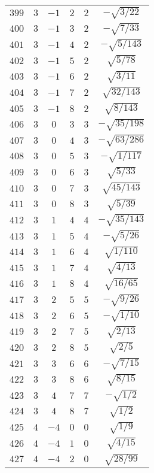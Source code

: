 \begin{table}
\begin{center}
\begin{tabular}{|c|c|c|c|c|c|}
$399$ & $3$ & $-1$ & $2$ & $2$ & $-\sqrt{3/22}$ \\ 
$400$ & $3$ & $-1$ & $3$ & $2$ & $-\sqrt{7/33}$ \\ 
$401$ & $3$ & $-1$ & $4$ & $2$ & $-\sqrt{5/143}$ \\ 
$402$ & $3$ & $-1$ & $5$ & $2$ & $\sqrt{5/78}$ \\ 
$403$ & $3$ & $-1$ & $6$ & $2$ & $\sqrt{3/11}$ \\ 
$404$ & $3$ & $-1$ & $7$ & $2$ & $\sqrt{32/143}$ \\ 
$405$ & $3$ & $-1$ & $8$ & $2$ & $\sqrt{8/143}$ \\ 
$406$ & $3$ & $0$ & $3$ & $3$ & $-\sqrt{35/198}$ \\ 
$407$ & $3$ & $0$ & $4$ & $3$ & $-\sqrt{63/286}$ \\ 
$408$ & $3$ & $0$ & $5$ & $3$ & $-\sqrt{1/117}$ \\ 
$409$ & $3$ & $0$ & $6$ & $3$ & $\sqrt{5/33}$ \\ 
$410$ & $3$ & $0$ & $7$ & $3$ & $\sqrt{45/143}$ \\ 
$411$ & $3$ & $0$ & $8$ & $3$ & $\sqrt{5/39}$ \\ 
$412$ & $3$ & $1$ & $4$ & $4$ & $-\sqrt{35/143}$ \\ 
$413$ & $3$ & $1$ & $5$ & $4$ & $-\sqrt{5/26}$ \\ 
$414$ & $3$ & $1$ & $6$ & $4$ & $\sqrt{1/110}$ \\ 
$415$ & $3$ & $1$ & $7$ & $4$ & $\sqrt{4/13}$ \\ 
$416$ & $3$ & $1$ & $8$ & $4$ & $\sqrt{16/65}$ \\ 
$417$ & $3$ & $2$ & $5$ & $5$ & $-\sqrt{9/26}$ \\ 
$418$ & $3$ & $2$ & $6$ & $5$ & $-\sqrt{1/10}$ \\ 
$419$ & $3$ & $2$ & $7$ & $5$ & $\sqrt{2/13}$ \\ 
$420$ & $3$ & $2$ & $8$ & $5$ & $\sqrt{2/5}$ \\ 
$421$ & $3$ & $3$ & $6$ & $6$ & $-\sqrt{7/15}$ \\ 
$422$ & $3$ & $3$ & $8$ & $6$ & $\sqrt{8/15}$ \\ 
$423$ & $3$ & $4$ & $7$ & $7$ & $-\sqrt{1/2}$ \\ 
$424$ & $3$ & $4$ & $8$ & $7$ & $\sqrt{1/2}$ \\ 
$425$ & $4$ & $-4$ & $0$ & $0$ & $\sqrt{1/9}$ \\ 
$426$ & $4$ & $-4$ & $1$ & $0$ & $\sqrt{4/15}$ \\ 
$427$ & $4$ & $-4$ & $2$ & $0$ & $\sqrt{28/99}$ \\ 

\end{tabular}
\end{center}
\end{table}
